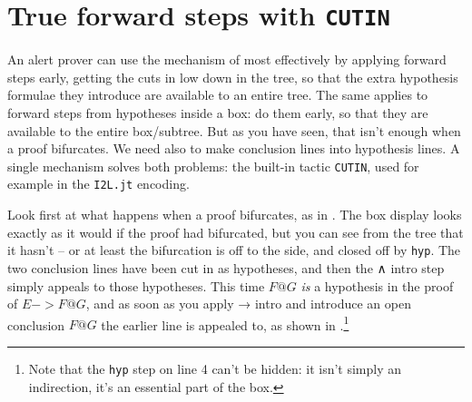 \documentclass[11pt]{article}
\newcommand{\textj}[1]{{\tt\small{#1}}}
\begin{document}
\section{True forward steps with \tt{CUTIN}}

An alert prover can use the mechanism of  most effectively by applying forward steps early, getting the cuts in low down in the tree, so that the extra hypothesis formulae they introduce are available to an entire tree. The same applies to forward steps from hypotheses inside a box: do them early, so that they are available to the entire box/subtree. But as you have seen, that isn't enough when a proof bifurcates. We need also to make conclusion lines into hypothesis lines. A single mechanism solves both problems: the built-in tactic \textj{CUTIN}, used for example in the \textj{I2L.jt} encoding.

Look first at what happens when a proof bifurcates, as in . The box display looks exactly as it would if the proof had bifurcated, but you can see from the tree that it hasn't -- or at least the bifurcation is off to the side, and closed off by \textj{hyp}. The two conclusion lines have been cut in as hypotheses, and then the ∧ intro step simply appeals to those hypotheses. This time $F@G$ \emph{is} a hypothesis in the proof of $E->F@G$, and as soon as you apply → intro and introduce an open conclusion $F@G$ the earlier line is appealed to, as shown in .\footnote{Note that the \textj{hyp} step on line 4 can't be hidden: it isn't simply an indirection, it's an essential part of the box.}
\end{document}
